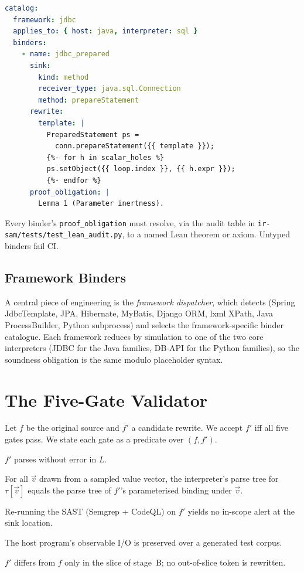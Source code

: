 \documentclass[conference]{IEEEtran}
\begin{document}
\begin{lstlisting}[style=code,language=YAML,
                   caption={Excerpt of the JDBC binder},
                   label={lst:binder},float=t]
catalog:
  framework: jdbc
  applies_to: { host: java, interpreter: sql }
  binders:
    - name: jdbc_prepared
      sink:
        kind: method
        receiver_type: java.sql.Connection
        method: prepareStatement
      rewrite:
        template: |
          PreparedStatement ps =
            conn.prepareStatement({{ template }});
          {%- for h in scalar_holes %}
          ps.setObject({{ loop.index }}, {{ h.expr }});
          {%- endfor %}
      proof_obligation: |
        Lemma 1 (Parameter inertness).
\end{lstlisting}

Every binder's \texttt{proof\_obligation} must resolve, via the
audit table in \texttt{ir-sam/tests/test\_lean\_audit.py}, to a
named Lean theorem or axiom.  Untyped binders fail CI.

\subsection{Framework Binders}\label{ssec:framework}
A central piece of engineering is the \emph{framework dispatcher},
which detects (Spring JdbcTemplate, JPA, Hibernate, MyBatis, Django
ORM, lxml XPath, Java ProcessBuilder, Python subprocess) and selects
the framework-specific binder catalogue.  Each framework reduces by
simulation to one of the two core interpreters (JDBC for the Java
families, DB-API for the Python families), so the soundness
obligation is the same modulo placeholder syntax.

\section{The Five-Gate Validator}\label{sec:validator}

Let $f$ be the original source and $f'$ a candidate rewrite. We
accept $f'$ iff all five gates pass.  We state each gate as a
predicate over $(f, f')$.

\begin{description}[leftmargin=*,labelindent=0pt]
\item[G\textsubscript{1} Syntactic.] $f'$ parses without error in $L$.
\item[G\textsubscript{2} Semantic preservation.] For all $\vec{v}$
  drawn from a sampled value vector, the interpreter's parse tree
  for $\tau[\vec{v}]$ equals the parse tree of $f'$'s parameterised
  binding under $\vec{v}$.
\item[G\textsubscript{3} Residual CWE.] Re-running the SAST
  (Semgrep + CodeQL) on $f'$ yields no in-scope alert at the sink
  location.
\item[G\textsubscript{4} Behavioural tests.] The host program's
  observable I/O is preserved over a generated test corpus.
\item[G\textsubscript{5} Patch minimality.] $f'$ differs from $f$
  only in the slice of stage~B; no out-of-slice token is rewritten.
\end{description}
\end{document}
